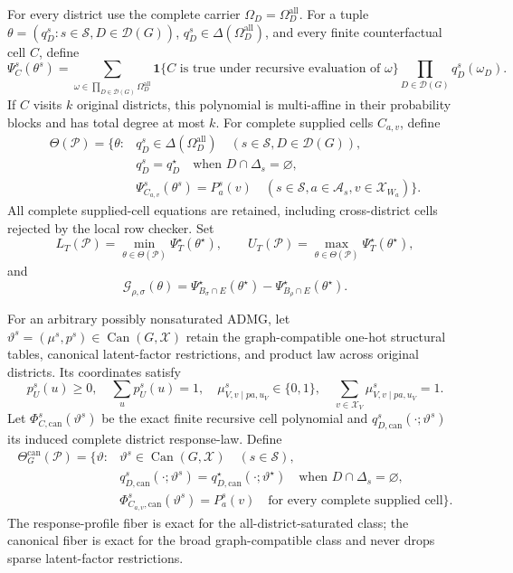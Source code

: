 For every district use the complete carrier \(\Omega_D=\Omega_D^{\mathrm{all}}\).  For a tuple \(\theta=(q_D^s:s\in\mathcal S,D\in\mathcal D(G))\), \(q_D^s\in\Delta(\Omega_D^{\mathrm{all}})\), and every finite counterfactual cell \(C\), define
\[
\Psi_C^s(\theta^s)=
\sum_{\omega\in\prod_{D\in\mathcal D(G)}\Omega_D^{\mathrm{all}}}
\mathbf 1\{C\text{ is true under recursive evaluation of }\omega\}
\prod_{D\in\mathcal D(G)}q_D^s(\omega_D).
\]
If \(C\) visits \(k\) original districts, this polynomial is multi-affine in their probability blocks and has total degree at most \(k\).  For complete supplied cells \(C_{a,v}\), define
\[
\begin{split}
\Theta(\mathcal P)=\bigl\{\theta:{}&q_D^s\in\Delta(\Omega_D^{\mathrm{all}})
\quad(s\in\mathcal S,D\in\mathcal D(G)),\\
&q_D^s=q_D^\star\quad\text{when }D\cap\Delta_s=\varnothing,\\
&\Psi_{C_{a,v}}^s(\theta^s)=P_a^s(v)
\quad(s\in\mathcal S,a\in\mathcal A_s,v\in\mathcal X_{W_a})\bigr\}.
\end{split}
\]
All complete supplied-cell equations are retained, including cross-district cells rejected by the local row checker.  Set
\[
L_T(\mathcal P)=\min_{\theta\in\Theta(\mathcal P)}\Psi_T^\star(\theta^\star),
\qquad
U_T(\mathcal P)=\max_{\theta\in\Theta(\mathcal P)}\Psi_T^\star(\theta^\star),
\]
and
\[
\mathcal G_{\rho,\sigma}(\theta)=
\Psi_{B_\sigma\cap E}^\star(\theta^\star)
-\Psi_{B_\rho\cap E}^\star(\theta^\star).
\]

For an arbitrary possibly nonsaturated ADMG, let \(\vartheta^s=(\mu^s,p^s)\in\operatorname{Can}(G,\mathcal X)\) retain the graph-compatible one-hot structural tables, canonical latent-factor restrictions, and product law across original districts.  Its coordinates satisfy
\[
p_U^s(u)\ge0,
\quad\sum_up_U^s(u)=1,
\quad\mu_{V,v\mid pa,u_V}^s\in\{0,1\},
\quad\sum_{v\in\mathcal X_V}\mu_{V,v\mid pa,u_V}^s=1.
\]
Let \(\Phi_{C,\mathrm{can}}^s(\vartheta^s)\) be the exact finite recursive cell polynomial and \(q_{D,\mathrm{can}}^s(\cdot;\vartheta^s)\) its induced complete district response-law.  Define
\[
\begin{split}
\Theta_G^{\mathrm{can}}(\mathcal P)=\bigl\{\vartheta:{}&
\vartheta^s\in\operatorname{Can}(G,\mathcal X)\quad(s\in\mathcal S),\\
&q_{D,\mathrm{can}}^s(\cdot;\vartheta^s)
=q_{D,\mathrm{can}}^\star(\cdot;\vartheta^\star)
\quad\text{when }D\cap\Delta_s=\varnothing,\\
&\Phi_{C_{a,v},\mathrm{can}}^s(\vartheta^s)=P_a^s(v)
\quad\text{for every complete supplied cell}\bigr\}.
\end{split}
\]
The response-profile fiber is exact for the all-district-saturated class; the canonical fiber is exact for the broad graph-compatible class and never drops sparse latent-factor restrictions.